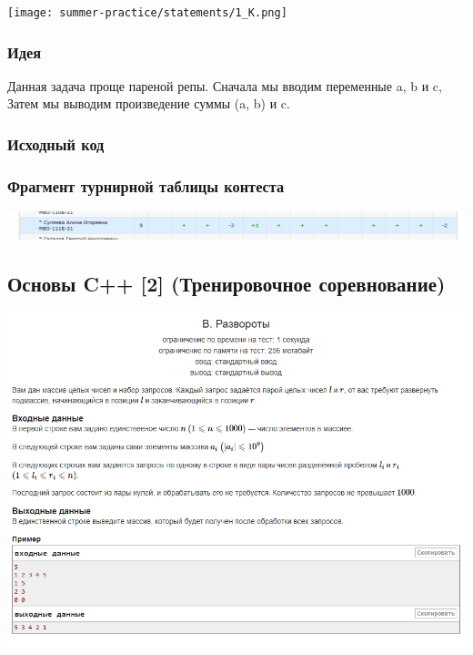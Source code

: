 \begin{center} 
\texttt{[image: summer-practice/statements/1\_K.png]}
\end{center} 
\subsubsection*{Идея}
Данная задача проще пареной репы. Сначала мы вводим переменные a, b и c, Затем мы выводим произведение суммы (a, b) и c.

\subsubsection*{Исходный код}



\subsubsection*{Фрагмент турнирной таблицы контеста}
\begin{center} 
\includegraphics[scale=0.5]{standings/1.png}\newline\noindent
\end{center} 
\pagebreak

\subsection*{Основы C++ [2] (Тренировочное соревнование)}
\begin{center} 
\includegraphics[scale=0.75]{statements/2_B.png}
\end{center} 
